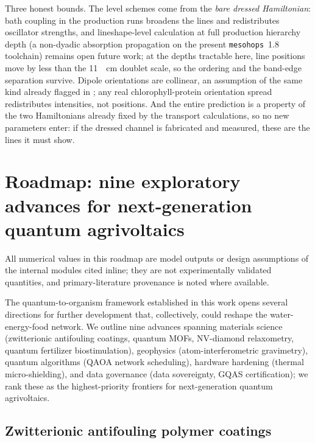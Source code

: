 \documentclass[11pt,a4paper]{article}
\begin{document}
Three honest bounds. The level schemes come from the \emph{bare dressed Hamiltonian}: bath coupling in the production runs broadens the lines and redistributes oscillator strengths, and lineshape-level calculation at full production hierarchy depth (a non-dyadic absorption propagation on the present \texttt{mesohops}~1.8 toolchain) remains open future work; at the depths tractable here, line positions move by less than the \qty{11}{\per\cm} doublet scale, so the ordering and the band-edge separation survive. Dipole orientations are collinear, an assumption of the same kind already flagged in ; any real chlorophyll-protein orientation spread redistributes intensities, not positions. And the entire prediction is a property of the two Hamiltonians already fixed by the transport calculations, so no new parameters enter: if the dressed channel is fabricated and measured, these are the lines it must show.

\section{Roadmap: nine exploratory advances for next-generation quantum agrivoltaics}
\label{SI-sec:roadmap}

All numerical values in this roadmap are model outputs or design assumptions of the internal modules cited inline; they are not experimentally validated quantities, and primary-literature provenance is noted where available.

The quantum-to-organism framework established in this work opens several directions for further development that, collectively, could reshape the water-energy-food network. We outline nine advances spanning materials science (zwitterionic antifouling coatings, quantum MOFs, NV-diamond relaxometry, quantum fertilizer biostimulation), geophysics (atom-interferometric gravimetry), quantum algorithms (QAOA network scheduling), hardware hardening (thermal micro-shielding), and data governance (data sovereignty, GQAS certification); we rank these as the highest-priority frontiers for next-generation quantum agrivoltaics.

\subsection{Zwitterionic antifouling polymer coatings}
\label{SI-sec:zwitterionic}
\end{document}
